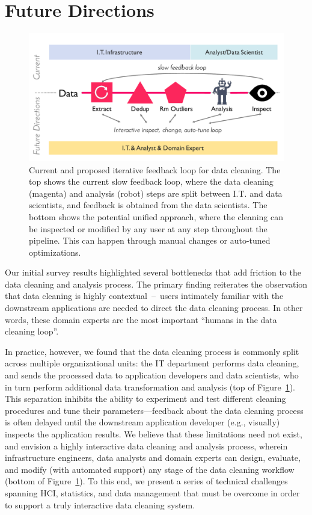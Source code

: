 \section{Future Directions}\label{sec:future}


\begin{figure}[ht]
  \centering
  \includegraphics[width=.95\columnwidth]{datafigs/arch}
  \caption{Current and proposed iterative feedback loop for data cleaning.  
  The top shows the current slow feedback loop, where the data cleaning (magenta) and analysis (robot) steps are split between I.T. and data scientists, and feedback is obtained from the data scientists. 
  The bottom shows the potential unified approach, where the cleaning can be inspected or modified by any user at any step throughout the pipeline.  This can happen through manual changes or auto-tuned optimizations.
  }
  \label{f:arch}
\end{figure}

Our initial survey results highlighted several bottlenecks that add friction to the data cleaning and analysis process.
The primary finding reiterates the observation that data cleaning is highly contextual~--~users intimately familiar with the downstream applications are needed to direct the data cleaning process.  In other words, these domain experts are the most important ``humans in the data cleaning loop''.  

In practice, however, we found that the data cleaning process is commonly split across multiple organizational units: the IT department performs data cleaning, and sends the processed data to application developers and data scientists, who in turn perform additional data transformation and analysis (top of Figure~\ref{f:arch}).  This separation inhibits the ability to experiment and test different cleaning procedures and tune their parameters---feedback about the data cleaning process is often delayed until the downstream application developer (e.g., visually) inspects the application results.  We believe that these limitations need not exist, and envision a highly interactive data cleaning and analysis process, wherein infrastructure engineers, data analysts and domain experts can design, evaluate, and modify (with automated support) any stage of the data cleaning workflow (bottom of Figure~\ref{f:arch}). To this end, we present a series of technical challenges spanning HCI, statistics, and data management that must be overcome in order to support a truly interactive data cleaning system.


